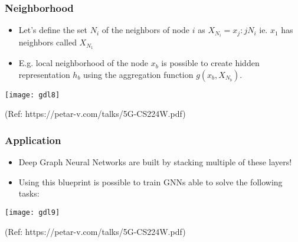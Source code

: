 \begin{frame}[fragile]\frametitle{Neighborhood}


\begin{itemize}
\item Let’s define the set $N_i$ of the neighbors of node $i$ as $X_{N_i}={x_j: j  N_i}$ ie. $x_1$ has neighbors called $X_{N_1}$
\item E.g. local neighborhood of the node $x_b$ is possible to create hidden representation $h_b$ using the aggregation function $g(x_b, X_{N_b})$.
 
\end{itemize}
	
\begin{center}
\texttt{[image: gdl8]}
\end{center}

{\tiny (Ref: https://petar-v.com/talks/5G-CS224W.pdf)}	

\end{frame}

\begin{frame}[fragile]\frametitle{Application}


\begin{itemize}
\item Deep Graph Neural Networks are built by stacking multiple of these layers!
\item Using this blueprint is possible to train GNNs able to solve the following tasks:
\end{itemize}
	
\begin{center}
\texttt{[image: gdl9]}
\end{center}

{\tiny (Ref: https://petar-v.com/talks/5G-CS224W.pdf)}	

\end{frame}


